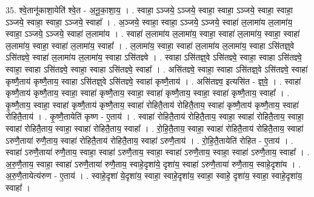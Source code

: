 \documentclass[17pt]{extarticle}
\begin{document}
35. श्वे॒तानू॑काशा॒येति॑ श्वे॒त - अ॒नू॒का॒शा॒य॒ । . स्वाहा॒ ऽञ्जये॒ ऽञ्जये॒ स्वाहा॒ स्वाहा॒ ऽञ्जये॒ स्वाहा॒ स्वाहा॒ ऽञ्जये॒ स्वाहा॒ स्वाहा॒ ऽञ्जये॒ स्वाहा᳚ । . अ॒ञ्जये॒ स्वाहा॒ स्वाहा॒ ऽञ्जये॒ ऽञ्जये॒ स्वाहा॑ ल॒लामा॑य ल॒लामा॑य॒ स्वाहा॒ ऽञ्जये॒ ऽञ्जये॒ स्वाहा॑ ल॒लामा॑य । . स्वाहा॑ ल॒लामा॑य ल॒लामा॑य॒ स्वाहा॒ स्वाहा॑ ल॒लामा॑य॒ स्वाहा॒ स्वाहा॑ ल॒लामा॑य॒ स्वाहा॒ स्वाहा॑ ल॒लामा॑य॒ स्वाहा᳚ । . ल॒लामा॑य॒ स्वाहा॒ स्वाहा॑ ल॒लामा॑य ल॒लामा॑य॒ स्वाहा ऽसि॑तज्ञ्॒वे ऽसि॑तज्ञ्वे॒ स्वाहा॑ ल॒लामा॑य ल॒लामा॑य॒ स्वाहा ऽसि॑तज्ञ्वे । . स्वाहा ऽसि॑तज्ञ्॒वे ऽसि॑तज्ञ्वे॒ स्वाहा॒ स्वाहा ऽसि॑तज्ञ्वे॒ स्वाहा॒ स्वाहा ऽसि॑तज्ञ्वे॒ स्वाहा॒ स्वाहा ऽसि॑तज्ञ्वे॒ स्वाहा᳚ । . असि॑तज्ञ्वे॒ स्वाहा॒ स्वाहा ऽसि॑तज्ञ्॒वे ऽसि॑तज्ञ्वे॒ स्वाहा॑ कृष्णै॒ताय॑ कृष्णै॒ताय॒ स्वाहा ऽसि॑तज्ञ्॒वे ऽसि॑तज्ञ्वे॒ स्वाहा॑ कृष्णै॒ताय॑ । . असि॑तज्ञ्व॒ इत्यसि॑त - ज्ञ्॒वे॒ । . स्वाहा॑ कृष्णै॒ताय॑ कृष्णै॒ताय॒ स्वाहा॒ स्वाहा॑ कृष्णै॒ताय॒ स्वाहा॒ स्वाहा॑ कृष्णै॒ताय॒ स्वाहा॒ स्वाहा॑ कृष्णै॒ताय॒ स्वाहा᳚ । . कृ॒ष्णै॒ताय॒ स्वाहा॒ स्वाहा॑ कृष्णै॒ताय॑ कृष्णै॒ताय॒ स्वाहा॑ रोहितै॒ताय॑ रोहितै॒ताय॒ स्वाहा॑ कृष्णै॒ताय॑ कृष्णै॒ताय॒ स्वाहा॑ रोहितै॒ताय॑ । . कृ॒ष्णै॒तायेति॑ कृष्ण - ए॒ताय॑ । . स्वाहा॑ रोहितै॒ताय॑ रोहितै॒ताय॒ स्वाहा॒ स्वाहा॑ रोहितै॒ताय॒ स्वाहा॒ स्वाहा॑ रोहितै॒ताय॒ स्वाहा॒ स्वाहा॑ रोहितै॒ताय॒ स्वाहा᳚ । . रो॒हि॒तै॒ताय॒ स्वाहा॒ स्वाहा॑ रोहितै॒ताय॑ रोहितै॒ताय॒ स्वाहा॑ ऽरुणै॒ताया॑ रुणै॒ताय॒ स्वाहा॑ रोहितै॒ताय॑ रोहितै॒ताय॒ स्वाहा॑ ऽरुणै॒ताय॑ । . रो॒हि॒तै॒तायेति॑ रोहित - ए॒ताय॑ । . स्वाहा॑ ऽरुणै॒ताया॑ रुणै॒ताय॒ स्वाहा॒ स्वाहा॑ ऽरुणै॒ताय॒ स्वाहा॒ स्वाहा॑ ऽरुणै॒ताय॒ स्वाहा॒ स्वाहा॑ ऽरुणै॒ताय॒ स्वाहा᳚ । . अ॒रु॒णै॒ताय॒ स्वाहा॒ स्वाहा॑ ऽरुणै॒ताया॑ रुणै॒ताय॒ स्वाहे॒दृशा॑ये॒ दृशा॑य॒ स्वाहा॑ ऽरुणै॒ताया॑ रुणै॒ताय॒ स्वाहे॒दृशा॑य । . अ॒रु॒णै॒तायेत्य॑रुण - ए॒ताय॑ । . स्वाहे॒दृशा॑ ये॒दृशा॑य॒ स्वाहा॒ स्वाहे॒दृशा॑य॒ स्वाहा॒ स्वाहे॒ दृशा॑य॒ स्वाहा॒ स्वाहे॒दृशा॑य॒ स्वाहा᳚ । \newline
\end{document}

